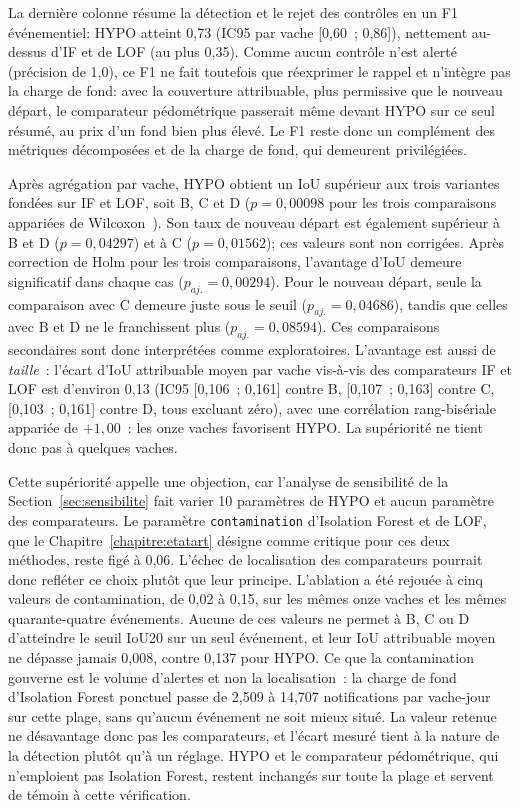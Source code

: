 La dernière colonne résume la détection et le rejet des contrôles en un F1 événementiel: HYPO atteint
0,73 (IC95 par vache [0,60~; 0,86]), nettement au-dessus d'IF et de LOF (au plus 0,35). Comme
aucun contrôle n'est alerté (précision de 1,0), ce F1 ne fait toutefois que réexprimer le rappel
et n'intègre pas la charge de fond: avec la couverture attribuable, plus permissive que le
nouveau départ, le comparateur pédométrique passerait même devant HYPO sur ce seul résumé, au
prix d'un fond bien plus élevé. Le
F1 reste donc un complément des métriques décomposées et de la charge de fond, qui demeurent
privilégiées.

Après agrégation par vache, HYPO obtient un IoU supérieur aux trois variantes fondées sur IF
et LOF, soit B, C et D
($p=0{,}00098$ pour les trois comparaisons appariées de Wilcoxon~\citep{wilcoxon1945individual}).
Son taux de nouveau départ est également supérieur à B et D ($p=0{,}04297$) et à C
($p=0{,}01562$); ces valeurs sont non corrigées. Après correction de Holm pour les trois
comparaisons, l'avantage d'IoU demeure significatif dans chaque cas ($p_{aj.}=0{,}00294$).
Pour le nouveau départ, seule la comparaison avec C demeure juste sous le seuil
($p_{aj.}=0{,}04686$), tandis que celles avec B et D ne le franchissent plus
($p_{aj.}=0{,}08594$). Ces comparaisons secondaires sont donc interprétées comme
exploratoires. L'avantage est aussi de
\emph{taille}~: l'écart d'IoU attribuable moyen par vache vis-à-vis des comparateurs IF et LOF
est d'environ 0,13 (IC95 [0,106~; 0,161] contre B, [0,107~; 0,163] contre C, [0,103~; 0,161]
contre D, tous excluant zéro), avec une corrélation rang-bisériale appariée
\citep{kerby2014simple} de $+1{,}00$~:
les onze vaches favorisent HYPO. La supériorité ne tient donc pas à quelques vaches.

Cette supériorité appelle une objection, car l'analyse de sensibilité de la
Section~\ref{sec:sensibilite} fait varier 10 paramètres de HYPO et aucun paramètre des
comparateurs. Le paramètre \texttt{contamination} d'Isolation Forest et de LOF, que le
Chapitre~\ref{chapitre:etatart} désigne comme critique pour ces deux méthodes, reste figé à
0,06. L'échec de localisation des comparateurs pourrait donc refléter ce choix plutôt que
leur principe. L'ablation a été rejouée à cinq valeurs de contamination, de 0,02 à 0,15, sur
les mêmes onze vaches et les mêmes quarante-quatre événements. Aucune de ces valeurs ne
permet à B, C ou D d'atteindre le seuil IoU20 sur un seul événement, et leur IoU attribuable
moyen ne dépasse jamais 0,008, contre 0,137 pour HYPO. Ce que la contamination gouverne est
le volume d'alertes et non la localisation~: la charge de fond d'Isolation Forest ponctuel
passe de 2,509 à 14,707 notifications par vache-jour sur cette plage, sans qu'aucun événement
ne soit mieux situé. La valeur retenue ne désavantage donc pas les comparateurs, et l'écart
mesuré tient à la nature de la détection plutôt qu'à un réglage. HYPO et le comparateur
pédométrique, qui n'emploient pas Isolation Forest, restent inchangés sur toute la plage et
servent de témoin à cette vérification.

